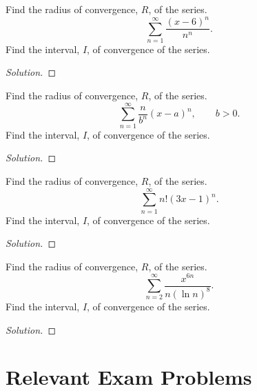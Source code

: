 \begin{problem}[WebAssign HW 28, \# 7]
Find the radius of convergence, $R$, of the series.
\[
\sum_{n=1}^\infty\frac{(x-6)^n}{n^n}.
\]
Find the interval, $I$, of convergence of the series.
\end{problem}
\begin{proof}[Solution]
\end{proof}
\begin{problem}[WebAssign HW 28, \# 8]
Find the radius of convergence, $R$, of the series.
\[
\sum_{n=1}^\infty\frac{n}{b^n}(x-a)^n, \qquad b>0.
\]
Find the interval, $I$, of convergence of the series.
\end{problem}
\begin{proof}[Solution]
\end{proof}
\begin{problem}[WebAssign HW 28, \# 9]
Find the radius of convergence, $R$, of the series.
\[
\sum_{n=1}^\infty n!(3x-1)^n.
\]
Find the interval, $I$, of convergence of the series.
\end{problem}
\begin{proof}[Solution]
\end{proof}
\begin{problem}[WebAssign HW 28, \# 10]
Find the radius of convergence, $R$, of the series.
\[
\sum_{n=2}^\infty\frac{x^{6n}}{n(\ln n)^8}.
\]
Find the interval, $I$, of convergence of the series.
\end{problem}
\begin{proof}[Solution]
\end{proof}


\chapter{Relevant Exam Problems}

